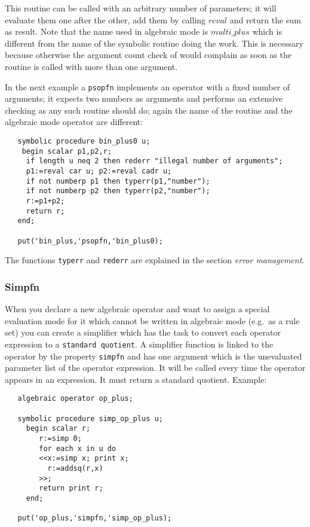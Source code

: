 This routine can be called with an arbitrary number of
parameters; it will evaluate them one after the other,
add them by calling $reval$ and return the sum as result.
Note that the name used in algebraic mode is $multi\_plus$
which is different from the name of the symbolic routine
doing the work. This is necessary because otherwise
the argument count check of {\reduce} would complain
as soon as the routine is called with more than one argument.

In the next example a {\tt psopfn} implements an operator with a
fixed number of arguments; it expects two numbers as
arguments and performs an extensive checking as any such routine
should do; again the name of the routine and the algebraic mode operator
are different:
\begin{verbatim}
   symbolic procedure bin_plus0 u;
    begin scalar p1,p2,r;
     if length u neq 2 then rederr "illegal number of arguments";
     p1:=reval car u; p2:=reval cadr u;
     if not numberp p1 then typerr(p1,"number");
     if not numberp p2 then typerr(p2,"number");
     r:=p1+p2;
     return r;
   end;

   put('bin_plus,'psopfn,'bin_plus0);
\end{verbatim}
The functions {\tt typerr} and {\tt rederr} are
explained in the section {\em error management}.

\subsubsection{Simpfn}

When you declare a new algebraic operator and want to assign a
special evaluation mode for it which cannot be written
in algebraic mode (e.g.\  as a rule set) you can create a
simplifier which has the task to convert each operator
expression to a {\tt standard quotient}.
A simplifier function is linked to the operator by
the property {\tt simpfn}
and has one argument which is the unevaluated parameter
list of the operator expression. It will be called
every time the operator appears in an expression. It 
must return a standard quotient. Example:

\begin{verbatim}
   algebraic operator op_plus;
 
   symbolic procedure simp_op_plus u;
     begin scalar r;
        r:=simp 0;
        for each x in u do 
        <<x:=simp x; print x;
          r:=addsq(r,x)
        >>;
        return print r;
     end;

   put('op_plus,'simpfn,'simp_op_plus);
\end{verbatim}

